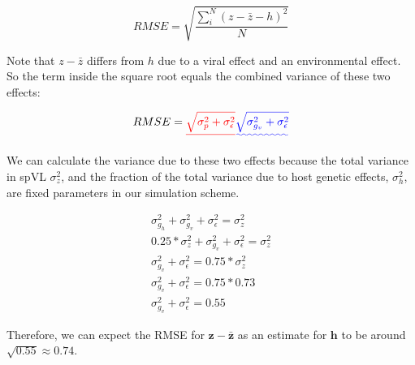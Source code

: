 \documentclass[12pt]{article} %
\providecommand{\DIFadd}[1]{{\protect\color{blue}\uwave{#1}}} %
\providecommand{\DIFdel}[1]{{\protect\color{red}\sout{#1}}}                      %
\providecommand{\DIFaddbegin}{} %
\providecommand{\DIFaddend}{} %
\providecommand{\DIFdelbegin}{} %
\providecommand{\DIFdelend}{} %
\newcommand{\DIFscaledelfig}{0.5}
\newlength{\DIFdelgraphicswidth} %
\newlength{\DIFdelgraphicsheight} %
\newcommand{\DIFaddincludegraphics}[2][]{{\color{blue}\fbox{\DIFOincludegraphics[#1]{#2}}}} %
\newcommand{\DIFdelincludegraphics}[2][]{%
\sbox{\DIFdelgraphicsbox}{\DIFOincludegraphics[#1]{#2}}%
\settoboxwidth{\DIFdelgraphicswidth}{\DIFdelgraphicsbox} %
\settoboxtotalheight{\DIFdelgraphicsheight}{\DIFdelgraphicsbox} %
\scalebox{\DIFscaledelfig}{%
\parbox[b]{\DIFdelgraphicswidth}{\usebox{\DIFdelgraphicsbox}\\[-\baselineskip] \rule{\DIFdelgraphicswidth}{0em}}\llap{\resizebox{\DIFdelgraphicswidth}{\DIFdelgraphicsheight}{%
\setlength{\unitlength}{\DIFdelgraphicswidth}%
\begin{picture}(1,1)%
\thicklines\linethickness{2pt} %
{\color[rgb]{1,0,0}\put(0,0){\framebox(1,1){}}}%
{\color[rgb]{1,0,0}\put(0,0){\line( 1,1){1}}}%
{\color[rgb]{1,0,0}\put(0,1){\line(1,-1){1}}}%
\end{picture}%
}\hspace*{3pt}}} %
} %
\DeclareRobustCommand{\DIFaddbegin}{\DIFOaddbegin \let\includegraphics\DIFaddincludegraphics} %
\DeclareRobustCommand{\DIFaddend}{\DIFOaddend \let\includegraphics\DIFOincludegraphics} %
\DeclareRobustCommand{\DIFdelbegin}{\DIFOdelbegin \let\includegraphics\DIFdelincludegraphics} %
\DeclareRobustCommand{\DIFdelend}{\DIFOaddend \let\includegraphics\DIFOincludegraphics} %
\begin{document}
\begin{doublespace}
\begin{equation}
    RMSE = \sqrt{\frac{\sum_i^N(z - \bar{z} - h)^2}{N}}
\end{equation}

Note that $z - \bar{z}$ differs from $h$ due to a viral effect and an environmental effect. So the term inside the square root equals the combined variance of these two effects:

\begin{equation}
    RMSE = \DIFdelbegin \DIFdel{\sqrt{\sigma^2_{p} + \sigma^2_\epsilon}
}\DIFdelend \DIFaddbegin \DIFadd{\sqrt{\sigma^2_{g_v} + \sigma^2_\epsilon}
}\DIFaddend \end{equation}

We can calculate the variance due to these two effects because the total variance in spVL $\sigma^2_z$, and the fraction of the total variance due to host genetic effects, \DIFdelbegin \DIFdel{$\sigma^2_{h}$}\DIFdelend \DIFaddbegin \DIFadd{$\sigma^2_{g_h}$}\DIFaddend , are fixed parameters in our simulation scheme.

\begin{equation}
\DIFdelbegin %
\DIFdelend \DIFaddbegin \begin{split}
    \sigma^2_{g_h} + \sigma^2_{g_v} + \sigma^2_\epsilon = \sigma^2_z \\
    0.25 * \sigma^2_{z} + \sigma^2_{g_v} + \sigma^2_\epsilon = \sigma^2_z \\
    \sigma^2_{g_v} + \sigma^2_\epsilon = 0.75 * \sigma^2_z \\
    \sigma^2_{g_v} + \sigma^2_\epsilon = 0.75 * 0.73 \\
    \sigma^2_{g_v} + \sigma^2_\epsilon = 0.55
\end{split}\DIFaddend 
\end{equation}

Therefore, we can expect the RMSE for $\bm{z} - \bm{\bar{z}}$ as an estimate for $\bm{h}$ to be around $\sqrt{0.55} \approx 0.74$. 


\end{doublespace}
\end{document}
